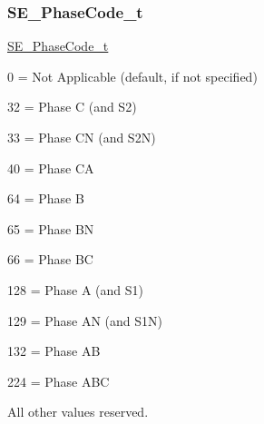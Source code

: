 \subsubsection{\texorpdfstring{S\+E\+\_\+\+Phase\+Code\+\_\+t}{SE\_PhaseCode\_t}}
{\footnotesize\ttfamily \hyperlink{group__PhaseCode_ga3eb7ce6c8beb3531baf0ba7723a2782c}{S\+E\+\_\+\+Phase\+Code\+\_\+t}}

0 = Not Applicable (default, if not specified)

32 = Phase C (and S2)

33 = Phase CN (and S2N)

40 = Phase CA

64 = Phase B

65 = Phase BN

66 = Phase BC

128 = Phase A (and S1)

129 = Phase AN (and S1N)

132 = Phase AB

224 = Phase A\+BC

All other values reserved. 
